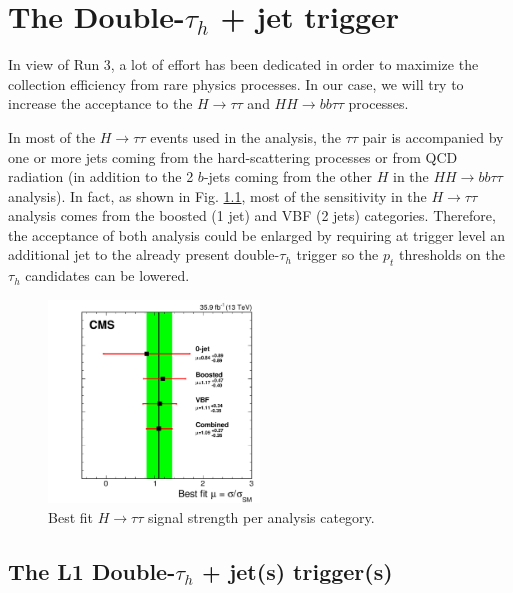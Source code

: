 \documentclass[../main.tex]{subfiles}
\begin{document}
\chapter{The Double-$\tau_h$ + jet trigger}

In view of Run 3, a lot of effort has been dedicated in order to maximize the collection efficiency from rare physics processes. In our case, we will try to increase the acceptance to the $H\to\tau\tau$ and $HH\to bb\tau\tau$ processes.

In most of the $H\to\tau\tau$ events used in the analysis, the $\tau\tau$ pair is accompanied by one or more jets coming from the hard-scattering processes or from QCD radiation (in addition to the 2 $b$-jets coming from the other $H$ in the $HH\to bb\tau\tau$ analysis). In fact, as shown in Fig. \ref{hh:fig:trig_htt_acc}, most of the sensitivity in the $H\to\tau\tau$ analysis \cite{hh:htt_2016} comes from the boosted (1 jet) and VBF (2 jets) categories. Therefore, the acceptance of both analysis could be enlarged by requiring at trigger level an additional jet to the already present double-$\tau_h$ trigger so the $p_t$ thresholds on the $\tau_h$ candidates can be lowered.


\begin{figure}[h!]
\begin{center}
\includegraphics[width=0.5\textwidth]{Images/CMS-HIG-16-043_Figure_021-a.png}
\end{center}
\caption{Best fit $H\to\tau\tau$ signal strength per analysis category.}
\label{hh:fig:trig_htt_acc}
\end{figure}



\section{The L1 Double-$\tau_h$ + jet(s) trigger(s)}
\end{document}
